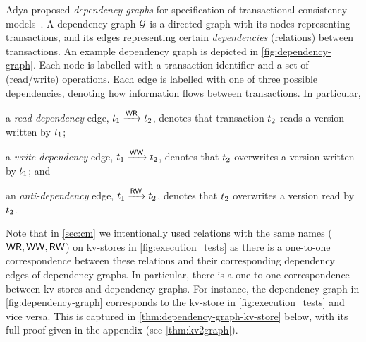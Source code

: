 Adya \etal proposed \emph{dependency graphs} for specification of transactional consistency models~\cite{adya-icde,adya}. 
A dependency graph $\mathcal{G}$ is a directed graph with its 
nodes representing transactions, 
and its edges representing certain \emph{dependencies} (relations) between transactions. 
An example dependency graph is depicted in \cref{fig:dependency-graph}. 
Each node is labelled with a transaction identifier and a set of (read/write) operations. 
Each edge is labelled with one of three possible dependencies, denoting how information flows between transactions. 
In particular,
\begin{enumerate*}
	\item a \emph{read dependency} edge, $t_1 \xrightarrow{\mathsf{WR}} t_2$, denotes
that transaction $t_2$ reads a version written by $t_1$;
	\item a \emph{write dependency} edge, $t_1 \xrightarrow{\mathsf{WW}} t_2$, denotes that $t_2$ overwrites a version written by $t_1$; and 
	\item an \emph{anti-dependency} edge, $t_1 \xrightarrow{\mathsf{RW}} t_2$, denotes that $t_2$ overwrites a version read by $t_2$. 
\end{enumerate*}



Note that in \cref{sec:cm} we intentionally used relations with the same names ($\mathsf{WR}, \mathsf{WW}, \mathsf{RW}$) on kv-stores in \cref{fig:execution_tests} as there is a one-to-one correspondence between these relations and their corresponding dependency edges of dependency graphs. 
In particular, there is a one-to-one correspondence between kv-stores and dependency graphs. 
For instance, the dependency graph in \cref{fig:dependency-graph} corresponds to the kv-store in \cref{fig:execution_tests} and vice versa. 
This is captured in \cref{thm:dependency-graph-kv-store} below, with its full proof given in the  appendix (see \cref{thm:kv2graph}). 


